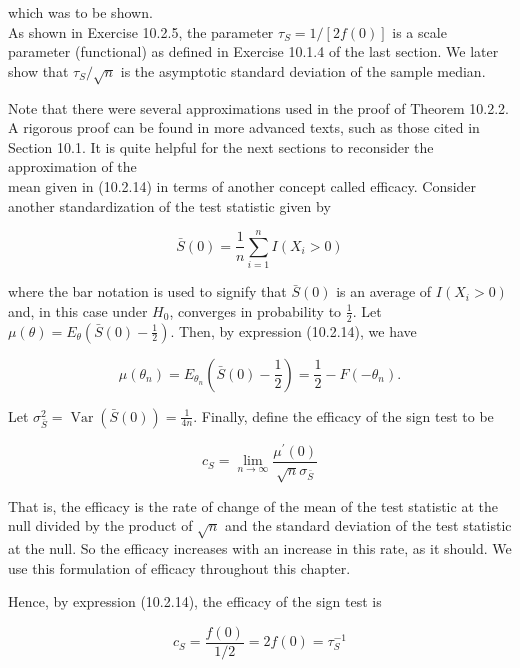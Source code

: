 which was to be shown.\\
As shown in Exercise 10.2.5, the parameter $\tau_{S}=1 /[2 f(0)]$ is a scale parameter (functional) as defined in Exercise 10.1.4 of the last section. We later show that $\tau_{S} / \sqrt{n}$ is the asymptotic standard deviation of the sample median.

Note that there were several approximations used in the proof of Theorem 10.2.2. A rigorous proof can be found in more advanced texts, such as those cited in Section 10.1. It is quite helpful for the next sections to reconsider the approximation of the\\
mean given in (10.2.14) in terms of another concept called efficacy. Consider another standardization of the test statistic given by


\begin{equation*}
\bar{S}(0)=\frac{1}{n} \sum_{i=1}^{n} I\left(X_{i}>0\right) \tag{10.2.16}
\end{equation*}


where the bar notation is used to signify that $\bar{S}(0)$ is an average of $I\left(X_{i}>0\right)$ and, in this case under $H_{0}$, converges in probability to $\frac{1}{2}$. Let $\mu(\theta)=E_{\theta}\left(\bar{S}(0)-\frac{1}{2}\right)$. Then, by expression (10.2.14), we have


\begin{equation*}
\mu\left(\theta_{n}\right)=E_{\theta_{n}}\left(\bar{S}(0)-\frac{1}{2}\right)=\frac{1}{2}-F\left(-\theta_{n}\right) . \tag{10.2.17}
\end{equation*}


Let $\sigma_{\bar{S}}^{2}=\operatorname{Var}(\bar{S}(0))=\frac{1}{4 n}$. Finally, define the efficacy of the sign test to be


\begin{equation*}
c_{S}=\lim _{n \rightarrow \infty} \frac{\mu^{\prime}(0)}{\sqrt{n} \sigma_{\bar{S}}} \tag{10.2.18}
\end{equation*}


That is, the efficacy is the rate of change of the mean of the test statistic at the null divided by the product of $\sqrt{n}$ and the standard deviation of the test statistic at the null. So the efficacy increases with an increase in this rate, as it should. We use this formulation of efficacy throughout this chapter.

Hence, by expression (10.2.14), the efficacy of the sign test is


\begin{equation*}
c_{S}=\frac{f(0)}{1 / 2}=2 f(0)=\tau_{S}^{-1} \tag{10.2.19}
\end{equation*}


